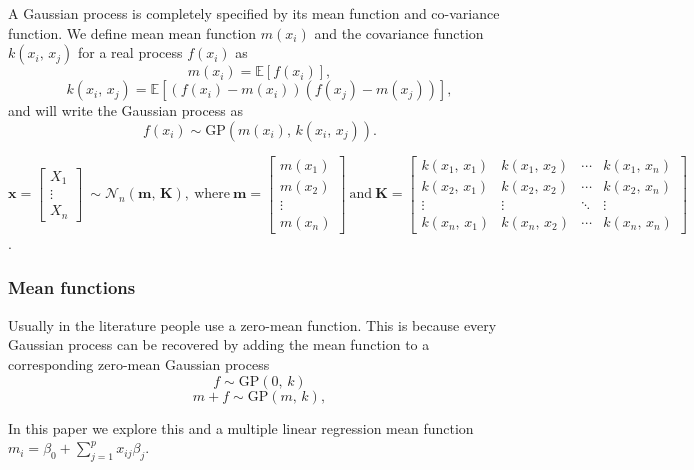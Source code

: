       \vspace{1em}

      A Gaussian process is completely specified by its mean function and co-variance function. We define mean mean function \(m(x_{i})\) and the covariance function \(k(x_{i},\, x_{j})\) for a real process \(f(x_{i})\) as
      \[m(x_{i}) = \mathbb{E}[f(x_{i})],\]
      \[k(x_{i},\, x_{j}) = \mathbb{E}[(f(x_{i}) - m(x_{i}))(f(x_{j}) - m(x_{j}))],\]
      and will write the Gaussian process as
      \[f(x_{i}) \sim \text{GP}(m(x_{i}), \, k(x_{i},\, x_{j})).\]

      \(\mathbf{x} =
      \begin{bmatrix}
         X_{1} \\
         \vdots \\
         X_{n}
      \end{bmatrix}
      \:
      \sim \mathcal{N}_{n}(\mathbf{m}, \, \mathbf{K}),
      \:
      \text{where}
      \:
      \mathbf{m} = 
      \begin{bmatrix}
         m(x_{1}) \\
         m(x_{2}) \\
         \vdots \\
         m(x_{n})
      \end{bmatrix}  
      \: 
      \text{and}
      \:
      \mathbf{K} = 
      \begin{bmatrix}
         k(x_{1}, \, x_{1}) & k(x_{1}, \, x_{2}) & \cdots & k(x_{1}, \, x_{n}) \\
         k(x_{2}, \, x_{1}) & k(x_{2}, \, x_{2}) & \cdots & k(x_{2}, \, x_{n}) \\
         \vdots & \vdots & \ddots & \vdots \\
         k(x_{n}, \, x_{1}) & k(x_{n}, \, x_{2}) & \cdots & k(x_{n}, \, x_{n})
      \end{bmatrix}\).

      \subsubsection{Mean functions}

         Usually in the literature people use a zero-mean function. \cite{Betancourt2020} This is because every Gaussian process can be recovered by adding the mean function to a corresponding zero-mean Gaussian process \[f \sim \text{GP}(0,\, k)\] \[m + f \sim \text{GP}(m,\, k),\] 
         
         In this paper we explore this and a multiple linear regression mean function \(m_{i} = \beta_0 + \sum_{j=1}^{p}x_{ij} \beta_{j}\).

